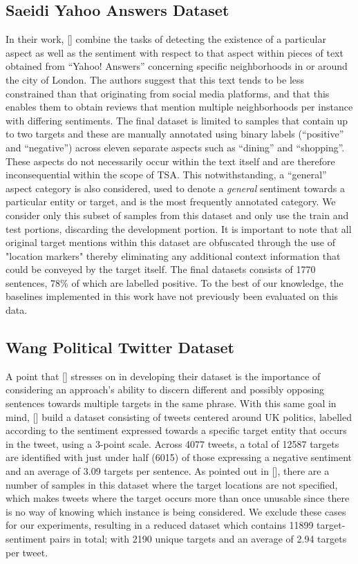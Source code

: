 \documentclass[12pt, a4paper]{report}
\theoremstyle{definition}
\theoremstyle{definition}%
\theoremstyle{definition}%
\theoremstyle{definition}%
\theoremstyle{definition}%
\theoremstyle{definition}%
\renewcommand{\cite}[1]{[\citealp{#1}]}
\begin{document}
\subsection{Saeidi Yahoo Answers Dataset}
In their work, \cite{saeidi2016} combine the tasks of detecting the existence of a particular aspect as well as the sentiment with respect to that aspect within pieces of text obtained from \enquote{Yahoo! Answers} concerning specific neighborhoods in or around the city of London. The authors suggest that this text tends to be less constrained than that originating from social media platforms, and that this enables them to obtain reviews that mention multiple neighborhoods per instance with differing sentiments. The final dataset is limited to samples that contain up to two targets and these are manually annotated using binary labels (\enquote{positive} and \enquote{negative}) across eleven separate aspects such as \enquote{dining} and \enquote{shopping}. These aspects do not necessarily occur within the text itself and are therefore inconsequential within the scope of TSA. This notwithstanding, a \enquote{general} aspect category is also considered, used to denote a \textit{general} sentiment towards a particular entity or target, and is the most frequently annotated category. We consider only this subset of samples from this dataset and only use the train and test portions, discarding the development portion. It is important to note that all original target mentions within this dataset are obfuscated through the use of "location markers" thereby eliminating any additional context information that could be conveyed by the target itself. The final datasets consists of 1770 sentences, 78\% of which are labelled positive. To the best of our knowledge, the baselines implemented in this work have not previously been evaluated on this data.

\subsection{Wang Political Twitter Dataset}
A point that \cite{saeidi2016} stresses on in developing their dataset is the importance of considering an approach's ability to discern different and possibly opposing sentences towards multiple targets in the same phrase. With this same goal in mind, \cite{wang2017} build a dataset consisting of tweets centered around UK politics, labelled according to the sentiment expressed towards a specific target entity that occurs in the tweet, using a 3-point scale. Across 4077 tweets, a total of 12587 targets are identified with just under half (6015) of those expressing a negative sentiment and an average of 3.09 targets per sentence. As pointed out in \cite{moore2018}, there are a number of samples in this dataset where the target locations are not specified, which makes tweets where the target occurs more than once unusable since there is no way of knowing which instance is being considered. We exclude these cases for our experiments, resulting in a reduced dataset which contains 11899 target-sentiment pairs in total; with 2190 unique targets and an average of 2.94 targets per tweet.
\end{document}
